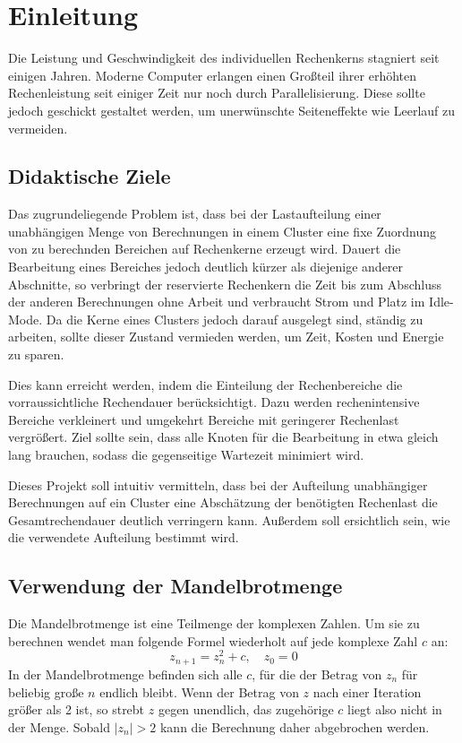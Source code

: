 \section{Einleitung}

Die Leistung und Geschwindigkeit des individuellen Rechenkerns stagniert seit einigen Jahren.
Moderne Computer erlangen einen Großteil ihrer erhöhten Rechenleistung
seit einiger Zeit nur noch durch Parallelisierung.
Diese sollte jedoch geschickt gestaltet werden, um unerwünschte Seiteneffekte
wie Leerlauf zu vermeiden.

\subsection{Didaktische Ziele}

Das zugrundeliegende Problem ist, dass bei der Lastaufteilung einer unabhängigen Menge
von Berechnungen in einem Cluster eine fixe Zuordnung von
zu berechnden Bereichen auf Rechenkerne erzeugt wird. Dauert die Bearbeitung eines Bereiches jedoch deutlich kürzer
als diejenige anderer Abschnitte, so verbringt der reservierte Rechenkern die Zeit bis zum Abschluss der anderen Berechnungen
ohne Arbeit und verbraucht Strom und Platz im Idle-Mode. Da die Kerne eines Clusters jedoch darauf ausgelegt sind, ständig zu arbeiten, sollte dieser Zustand vermieden
werden, um Zeit, Kosten und Energie zu sparen.

Dies kann erreicht werden, indem die Einteilung der Rechenbereiche die vorraussichtliche Rechendauer berücksichtigt.
Dazu werden rechenintensive Bereiche verkleinert und umgekehrt Bereiche mit geringerer Rechenlast vergrößert.
Ziel sollte sein, dass alle Knoten für die Bearbeitung in etwa gleich lang brauchen,
sodass die gegenseitige Wartezeit minimiert wird.

Dieses Projekt soll intuitiv vermitteln, dass bei der Aufteilung unabhängiger
Berechnungen auf ein Cluster eine Abschätzung der benötigten Rechenlast die Gesamtrechendauer deutlich verringern kann.
Außerdem soll ersichtlich sein, wie die verwendete Aufteilung bestimmt wird.

\subsection{Verwendung der Mandelbrotmenge}

Die Mandelbrotmenge ist eine Teilmenge der komplexen Zahlen.
Um sie zu berechnen wendet man folgende Formel wiederholt auf jede komplexe Zahl $c$ an:
\begin{equation}\label{equ:mandelbrot}
	z_{n+1} = z_{n}^2 + c, \quad z_0 = 0
\end{equation}
In der Mandelbrotmenge befinden sich alle $c$, für die der Betrag von $z_n$ für beliebig große $n$ endlich bleibt.
Wenn der Betrag von $z$ nach einer Iteration größer als 2 ist, so strebt $z$ gegen unendlich, das zugehörige $c$ liegt also nicht in der Menge.
Sobald $|z_n| > 2$ kann die Berechnung daher abgebrochen werden.

